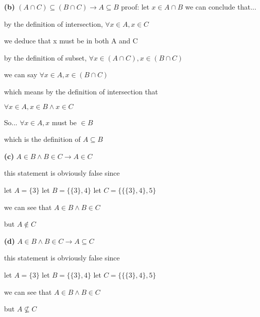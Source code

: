 \documentclass[12pts,A4]{article}
\begin{document}
\begin{flushleft}
    \textbf{(b)} $(A \cap C ) \subseteq (B \cap C) \rightarrow A \subseteq B$
    proof:
    \bigskip
    let $x \in A \cap B$
    we can conclude that... 
    \bigskip
    
    by the definition of intersection, $\forall x \in A, x \in C$
    
    we deduce that x must be in both A and C 

    \bigskip

    by the definition of subset, $\forall x \in (A \cap C), x \in (B \cap C)$

    
    we can say $\forall x \in A, x \in (B \cap C)$

    \bigskip
    which means by the definition of intersection that 

    $\forall x \in A, x \in B \wedge x\in C$

    So... $\forall x \in A, x$ must be $\in B$

    which is the definition of $ A \subseteq B $





\end{flushleft}


\begin{flushleft}
   \textbf{(c)} $A \in B \wedge B \in C \rightarrow A \in C$ 
    
    this statement is obviously false since

    let $ A = \{ 3 \}$
    let $ B = \{ \{ 3 \}, 4 \}$
    let $ C = \{ \{ \{ 3 \}, 4 \}, 5 \}$

    \bigskip

    we can see that $A \in B \wedge B \in C$

    but $A \not\in C$



\end{flushleft}


\begin{flushleft}
   \textbf{(d)} $A \in B \wedge B \in C \rightarrow A \subseteq C$ 
    
    this statement is obviously false since

    let $ A = \{ 3 \}$
    let $ B = \{ \{ 3 \}, 4 \}$
    let $ C = \{ \{ \{ 3 \}, 4 \}, 5 \}$

    \bigskip

    we can see that $A \in B \wedge B \in C$

    but $A \not\subseteq C$



\end{flushleft}
\end{document}
